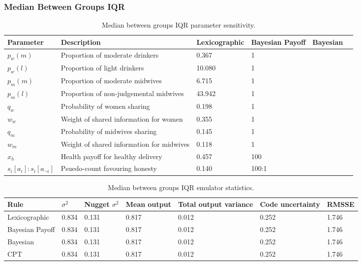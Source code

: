 \subsubsection{Median Between Groups IQR}

\begin{table}[h!]
\center
\begin{tabular} {|l | l | l | l | l | l |}
\hline
Parameter & Description & Lexicographic & Bayesian Payoff & Bayesian & \ac(CPT) \\ \hline
\(p_{w}(m)\) & Proportion of moderate drinkers & 0.367 & 1 \\ \hline
\(p_{w}(l)\) & Proportion of light drinkers & 10.080 & 1 \\ \hline
\(p_{m}(m)\) & Proportion of moderate midwives & 6.715 & 1 \\ \hline
\(p_{m}(l)\) & Proportion of non-judgemental midwives & 43.942 & 1 \\ \hline
\(q_{w}\) & Probability of women sharing & 0.198 & 1 \\ \hline
\(w_{w}\) & Weight of shared information for women & 0.355 & 1 \\ \hline
\(q_{m}\) & Probability of midwives sharing & 0.145 & 1 \\ \hline
\(w_{m}\) & Weight of shared information for midwives & 0.118 & 1 \\ \hline
\(x_{h}\) & Health payoff for healthy delivery & 0.457 & 100 \\ \hline
\(s_{i}[a_{i}]:s_{i}[a_{\neg i}]\) & Psuedo-count favouring honesty & 0.140 & 100:1 \\ \hline
\end{tabular}
\caption[Table caption text]{Median between groups IQR parameter sensitivity. \label{tab:sa_results_iqr}}
\end{table}

\begin{table}[h!]
\center
\begin{tabular} {|l | l | l | l | l | l |}
\hline
Rule & \(\sigma^2\) & Nugget \(\sigma^2\) & Mean output & Total output variance & Code uncertainty & RMSSE \\ \hline
Lexicographic & 0.834 & 0.131 &  0.817 & 0.012 & 0.252 & 1.746 \\ \hline
Bayesian Payoff & 0.834 & 0.131 &  0.817 & 0.012 & 0.252 & 1.746 \\ \hline
Bayesian & 0.834 & 0.131 &  0.817 & 0.012 & 0.252 & 1.746 \\ \hline
\ac{CPT} & 0.834 & 0.131 &  0.817 & 0.012 & 0.252 & 1.746 \\ \hline
\end{tabular}
\caption[Table caption text]{Median between groups IQR emulator statistics. \label{tab:sa_emulator_iqr}}
\end{table}

